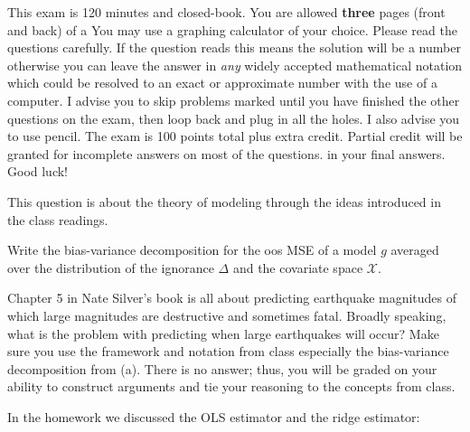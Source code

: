 \documentclass[12pt]{article}
\begin{document}
This exam is 120 minutes and closed-book. You are allowed \textbf{three} pages (front and back) of a  You may use a graphing calculator of your choice. Please read the questions carefully. If the question reads  this means the solution will be a number otherwise you can leave the answer in \textit{any} widely accepted mathematical notation which could be resolved to an exact or approximate number with the use of a computer. I advise you to skip problems marked  until you have finished the other questions on the exam, then loop back and plug in all the holes. I also advise you to use pencil. The exam is 100 points total plus extra credit. Partial credit will be granted for incomplete answers on most of the questions.  in your final answers. Good luck!

\pagebreak


\problem This question is about the theory of modeling through the ideas introduced in the class readings.

\benum

 Write the bias-variance decomposition for the oos MSE of a model $g$ averaged over the distribution of the ignorance $\Delta$ and the covariate space $\mathcal{X}$.

 Chapter 5 in Nate Silver's book  is all about predicting earthquake magnitudes of which large magnitudes are destructive and sometimes fatal. Broadly speaking, what is the problem with predicting when large earthquakes will occur? Make sure you use the framework and notation from class especially the bias-variance decomposition from (a). There is no  answer; thus, you will be graded on your ability to construct arguments and tie your reasoning to the concepts from class. 




\eenum


\problem In the homework we discussed the OLS estimator and the ridge estimator:
\end{document}
